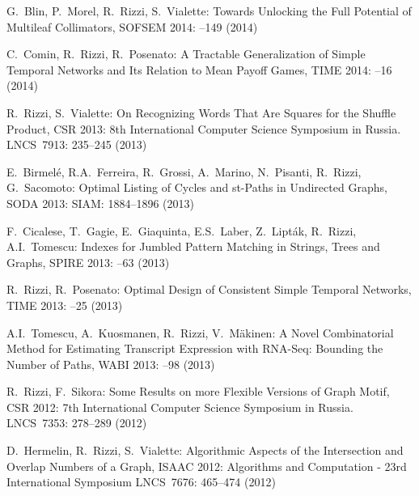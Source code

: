 \begin{etaremune}
  \item {G.~Blin, P.~Morel, R.~Rizzi, S.~Vialette:}
   \newblock Towards Unlocking the Full Potential of Multileaf Collimators,
   \newblock SOFSEM 2014:
   --149 (2014)

  \item {C.~Comin, R.~Rizzi, R.~Posenato:}
   \newblock A Tractable Generalization of Simple Temporal Networks and Its Relation to Mean Payoff Games,
   \newblock TIME 2014:
   --16 (2014)

  \item {R.~Rizzi, S.~Vialette:}
   \newblock On Recognizing Words That Are Squares for the Shuffle Product,
   \newblock CSR 2013: 8th International Computer Science Symposium in Russia.
   \newblock LNCS~7913: 235--245 (2013)

  \item {E.~Birmel\'e, R.A.~Ferreira, R.~Grossi, A.~Marino, N.~Pisanti, R.~Rizzi, G.~Sacomoto:}
   \newblock Optimal Listing of Cycles and st-Paths in Undirected Graphs,
   \newblock SODA 2013:
   \newblock SIAM: 1884--1896 (2013)

  \item {F.~Cicalese, T.~Gagie, E.~Giaquinta, E.S.~Laber, Z.~Lipt\'ak, R.~Rizzi, A.I.~Tomescu:}
   \newblock Indexes for Jumbled Pattern Matching in Strings, Trees and Graphs,
   \newblock SPIRE 2013:
   --63 (2013)

  \item {R.~Rizzi, R.~Posenato:}
   \newblock Optimal Design of Consistent Simple Temporal Networks,
   \newblock TIME 2013:
   --25 (2013)

  \item {A.I.~Tomescu, A.~Kuosmanen, R.~Rizzi, V.~M\"akinen:}
   \newblock A Novel Combinatorial Method for Estimating Transcript Expression with RNA-Seq: Bounding the Number of Paths,
   \newblock WABI 2013:
   --98 (2013)

\vspace{-1.8mm}
  \item {R.~Rizzi, F.~Sikora:}
   \newblock Some Results on more Flexible Versions of Graph Motif,
   \newblock CSR 2012: 7th International Computer Science Symposium in Russia.
   \newblock LNCS~7353: 278--289 (2012)

\vspace{-1.8mm}
  \item {D.~Hermelin, R.~Rizzi, S.~Vialette:}
   \newblock Algorithmic Aspects of the Intersection and Overlap Numbers of a Graph,
   \newblock ISAAC 2012: Algorithms and Computation - 23rd International Symposium
   \newblock LNCS~7676: 465--474 (2012)


\end{etaremune}
